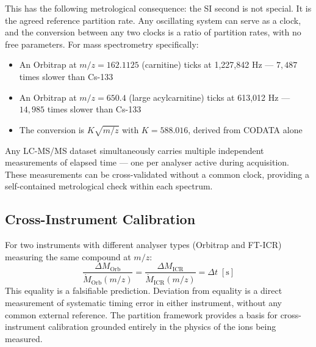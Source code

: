 \documentclass[11pt,twocolumn,a4paper]{article}
\theoremstyle{plain}
\theoremstyle{definition}
\theoremstyle{remark}
\begin{document}
This has the following metrological consequence: the SI second is not special.
It is the agreed reference partition rate. Any oscillating system can serve as a
clock, and the conversion between any two clocks is a ratio of partition rates,
with no free parameters. For mass spectrometry specifically:
\begin{itemize}
    \item An Orbitrap at $m/z = 162.1125$ (carnitine) ticks at
          1,227,842 Hz --- $7{,}487$ times slower than Cs-133
    \item An Orbitrap at $m/z = 650.4$ (large acylcarnitine) ticks at
          613,012 Hz --- $14{,}985$ times slower than Cs-133
    \item The conversion is $K\sqrt{m/z}$ with $K = 588.016$, derived
          from CODATA alone
\end{itemize}
Any LC-MS/MS dataset simultaneously carries multiple independent measurements of
elapsed time --- one per analyser active during acquisition. These measurements
can be cross-validated without a common clock, providing a self-contained
metrological check within each spectrum.

\subsection{Cross-Instrument Calibration}
\label{subsec:cross_calibration}

For two instruments with different analyser types (Orbitrap and FT-ICR)
measuring the same compound at $m/z$:
\begin{equation}
    \frac{\Delta M_{\mathrm{Orb}}}{\dot{M}_{\mathrm{Orb}}(m/z)} =
    \frac{\Delta M_{\mathrm{ICR}}}{\dot{M}_{\mathrm{ICR}}(m/z)} = \Delta t
    \;\mathrm{[s]}
    \label{eq:cross_calibration}
\end{equation}
This equality is a falsifiable prediction. Deviation from equality is a direct
measurement of systematic timing error in either instrument, without any common
external reference. The partition framework provides a basis for cross-instrument
calibration grounded entirely in the physics of the ions being measured.
\end{document}
